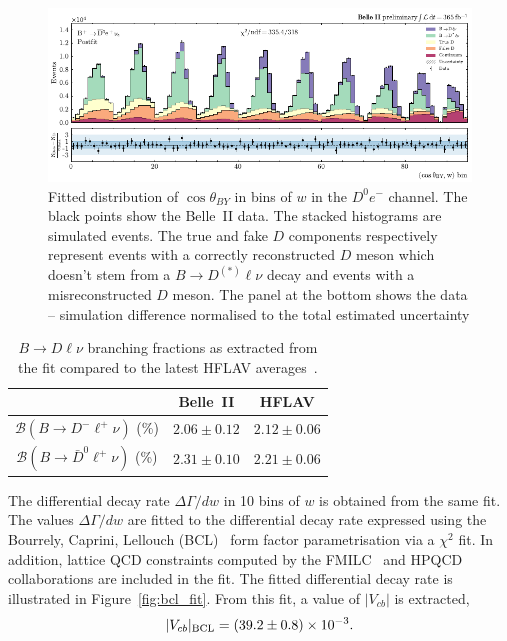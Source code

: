 \documentclass{moriond}
\def\vcb{V_{cb}}
\def\btodlnu{B \to D\ell\nu}
\def\costby{\cos\theta_{BY}}
\begin{document}
\begin{figure}[h!]
    \centering
    \includegraphics[scale=0.9]{Figures/2d_fit.pdf}
    \caption{Fitted distribution of $\costby$ in bins of $w$ in the $D^0e^-$ channel. The black points show the Belle~II data. The stacked histograms are simulated events. The true and fake $D$ components respectively represent events with a correctly reconstructed $D$ meson which doesn't stem from a $B \to D^{(*)} \ell \nu$ decay and events with a misreconstructed $D$ meson. The panel at the bottom shows the data -- simulation difference normalised to the total estimated uncertainty}
    \label{fig:2d_fit}
\end{figure}
\begin{table}[h!]
    \centering
    \caption{$\btodlnu$ branching fractions as extracted from the fit compared to the latest HFLAV averages~\cite{hflav}.}
    \begin{tabular}{|c c c|}
         \hline
         & Belle~II & HFLAV \\
         \hline
        $\mathcal{B}(B \to D^- \ell^+ \nu)$ (\%) & $2.06 \pm 0.12$ & $2.12 \pm 0.06$ \\
        $\mathcal{B}(B \to \bar{D}^0 \ell^+ \nu)$ (\%) & $2.31 \pm 0.10$ & $2.21 \pm 0.06$ \\
         \hline
    \end{tabular}
    \label{tab:br}
\end{table}
The differential decay rate $\Delta\Gamma/dw$ in 10 bins of $w$ is obtained from the same fit. The values $\Delta\Gamma/dw$ are fitted to the differential decay rate expressed using the Bourrely, Caprini, Lellouch (BCL)~\cite{bcl} form factor parametrisation via a $\chi^2$ fit. In addition, lattice QCD constraints computed by the FMILC~\cite{fmilc} and HPQCD~\cite{hpqcd} collaborations are included in the fit. The fitted differential decay rate is illustrated in Figure~\ref{fig:bcl_fit}. From this fit, a value of $|\vcb|$ is extracted,
\begin{equation}
    |\vcb|_{\rm BCL} = (39.2 \pm 0.8) \times 10^{-3}.
\end{equation}
\end{document}
